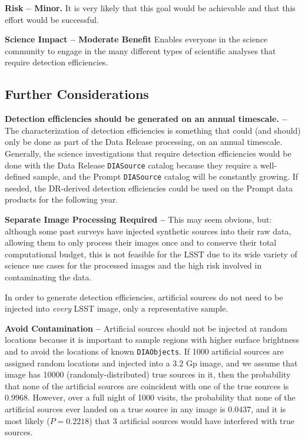 {\bf Risk -- Minor.}
It is very likely that this goal would be achievable and that this effort would be successful.

{\bf Science Impact -- Moderate Benefit}
Enables everyone in the science community to engage in the many different types of scientific analyses that require detection efficiencies.



\subsection{Further Considerations}\label{ssec:opts_plus}

{\bf Detection efficiencies should be generated on an annual timescale. -- }
The characterization of detection efficiencies is something that could (and should) only be done as part of the Data Release processing, on an annual timescale. 
Generally, the science investigations that require detection efficiencies would be done with the Data Release {\tt DIASource} catalog because they require a well-defined sample, and the Prompt {\tt DIASource} catalog will be constantly growing.
If needed, the DR-derived detection efficiencies could be used on the Prompt data products for the following year.

{\bf Separate Image Processing Required -- }
This may seem obvious, but: although some past surveys have injected synthetic sources into their raw data, allowing them to only process their images once and to conserve their total computational budget, this is not feasible for the LSST due to its wide variety of science use cases for the processed images and the high risk involved in contaminating the data.

In order to generate detection efficiencies, artificial sources do not need to be injected into {\it every} LSST image, only a representative sample.

{\bf Avoid Contamination -- }
Artificial sources should not be injected at random locations because it is important to sample regions with higher surface brightness and to avoid the locations of known {\tt DIAObjects}.
If 1000 artificial sources are assigned random locations and injected into a 3.2 Gp image, and we assume that image has 10000 (randomly-distributed) true sources in it, then the probability that none of the artificial sources are coincident with one of the true sources is $0.9968$.
However, over a full night of 1000 visits, the probability that none of the artificial sources ever landed on a true source in any image is $0.0437$, and it is most likely ($P=0.2218$) that 3 artificial sources would have interfered with true sources. 
